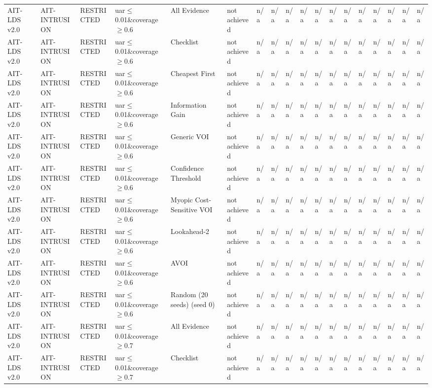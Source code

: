 \begin{table}[!ht]
{\begin{tabular}{llllllllllllllllll}
AIT-LDS v2.0 & AIT-INTRUSION & RESTRICTED & uar$\le$0.01\&coverage$\ge$0.6 & All Evidence & not achieved & n/a & n/a & n/a & n/a & n/a & n/a & n/a & n/a & n/a & n/a & n/a & n/a \\
AIT-LDS v2.0 & AIT-INTRUSION & RESTRICTED & uar$\le$0.01\&coverage$\ge$0.6 & Checklist & not achieved & n/a & n/a & n/a & n/a & n/a & n/a & n/a & n/a & n/a & n/a & n/a & n/a \\
AIT-LDS v2.0 & AIT-INTRUSION & RESTRICTED & uar$\le$0.01\&coverage$\ge$0.6 & Cheapest First & not achieved & n/a & n/a & n/a & n/a & n/a & n/a & n/a & n/a & n/a & n/a & n/a & n/a \\
AIT-LDS v2.0 & AIT-INTRUSION & RESTRICTED & uar$\le$0.01\&coverage$\ge$0.6 & Information Gain & not achieved & n/a & n/a & n/a & n/a & n/a & n/a & n/a & n/a & n/a & n/a & n/a & n/a \\
AIT-LDS v2.0 & AIT-INTRUSION & RESTRICTED & uar$\le$0.01\&coverage$\ge$0.6 & Generic VOI & not achieved & n/a & n/a & n/a & n/a & n/a & n/a & n/a & n/a & n/a & n/a & n/a & n/a \\
AIT-LDS v2.0 & AIT-INTRUSION & RESTRICTED & uar$\le$0.01\&coverage$\ge$0.6 & Confidence Threshold & not achieved & n/a & n/a & n/a & n/a & n/a & n/a & n/a & n/a & n/a & n/a & n/a & n/a \\
AIT-LDS v2.0 & AIT-INTRUSION & RESTRICTED & uar$\le$0.01\&coverage$\ge$0.6 & Myopic Cost-Sensitive VOI & not achieved & n/a & n/a & n/a & n/a & n/a & n/a & n/a & n/a & n/a & n/a & n/a & n/a \\
AIT-LDS v2.0 & AIT-INTRUSION & RESTRICTED & uar$\le$0.01\&coverage$\ge$0.6 & Lookahead-2 & not achieved & n/a & n/a & n/a & n/a & n/a & n/a & n/a & n/a & n/a & n/a & n/a & n/a \\
AIT-LDS v2.0 & AIT-INTRUSION & RESTRICTED & uar$\le$0.01\&coverage$\ge$0.6 & AVOI & not achieved & n/a & n/a & n/a & n/a & n/a & n/a & n/a & n/a & n/a & n/a & n/a & n/a \\
AIT-LDS v2.0 & AIT-INTRUSION & RESTRICTED & uar$\le$0.01\&coverage$\ge$0.6 & Random (20 seeds) (seed 0) & not achieved & n/a & n/a & n/a & n/a & n/a & n/a & n/a & n/a & n/a & n/a & n/a & n/a \\
AIT-LDS v2.0 & AIT-INTRUSION & RESTRICTED & uar$\le$0.01\&coverage$\ge$0.7 & All Evidence & not achieved & n/a & n/a & n/a & n/a & n/a & n/a & n/a & n/a & n/a & n/a & n/a & n/a \\
AIT-LDS v2.0 & AIT-INTRUSION & RESTRICTED & uar$\le$0.01\&coverage$\ge$0.7 & Checklist & not achieved & n/a & n/a & n/a & n/a & n/a & n/a & n/a & n/a & n/a & n/a & n/a & n/a \\

\end{tabular}}
\end{table}
